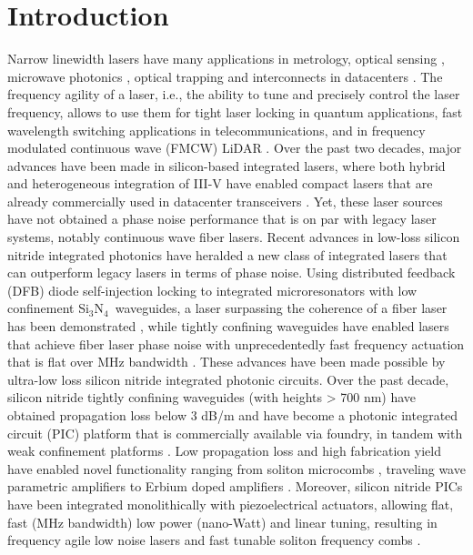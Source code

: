 \documentclass[9pt,twocolumn,twoside, superscriptaddress]{revtex4-2}
\newcommand{\SiN}[0]{Si$_3$N$_4$~}
\begin{document}
\section{Introduction}
Narrow linewidth lasers have many applications in metrology, optical sensing \cite{rogers1999distributed}, microwave photonics \cite{marpaung2019integrated,Pillet:08}, optical trapping \cite{Niffenegger2020} and interconnects in datacenters \cite{9057434}.
The frequency agility of a laser, i.e., the ability to tune and precisely control the laser frequency, allows to use them for tight laser locking in quantum applications, fast wavelength switching applications in telecommunications, and in frequency modulated continuous wave (FMCW) LiDAR \cite{dale2014ultra,hecht2018lidar,rogers2021universal,martin2018photonic,isaac2019indium}.
Over the past two decades, major advances have been made in silicon-based integrated lasers, where both hybrid and heterogeneous integration of III-V have enabled compact lasers that are already commercially used in datacenter transceivers \cite{Komljenovic:16,Tran:2020}.  
Yet, these laser sources have not obtained a phase noise performance that is on par with legacy laser systems, notably continuous wave fiber lasers.
Recent advances in low-loss silicon nitride integrated photonics have heralded a new class of integrated lasers that can outperform legacy lasers in terms of phase noise. 
Using distributed feedback (DFB) diode self-injection locking to integrated microresonators with low confinement \SiN waveguides, a laser surpassing the coherence of a fiber laser has been demonstrated \cite{li2021reaching,Jin2021}, while tightly confining waveguides have enabled lasers that achieve fiber laser phase noise with unprecedentedly fast frequency actuation that is flat over MHz bandwidth \cite{lihachev2022low}.
These advances have been made possible by ultra-low loss silicon nitride integrated photonic circuits.
Over the past decade, silicon nitride tightly confining waveguides (with heights > 700 nm) have obtained propagation loss below 3 dB/m and have become a photonic integrated circuit (PIC) platform that is commercially available via foundry, in tandem with weak confinement platforms \cite{Jin2021}. 
Low propagation loss and high fabrication yield \cite{liu2021high} have enabled novel functionality ranging from soliton microcombs \cite{doi:10.1126/science.abh2076}, traveling wave parametric amplifiers \cite{Riemensberger2022} to Erbium doped amplifiers \cite{doi:10.1126/science.abo2631}. 
Moreover, silicon nitride PICs have been integrated monolithically with piezoelectrical actuators, allowing flat, fast (MHz bandwidth) low power (nano-Watt) and linear tuning, resulting in frequency agile low noise lasers \cite{lihachev2022low} and fast tunable soliton frequency combs \cite{liu2020monolithic}.
\end{document}
